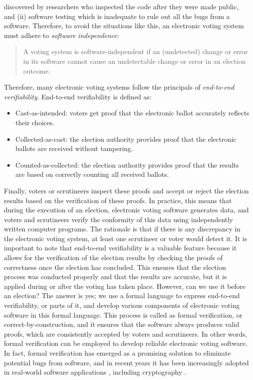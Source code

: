 \documentclass[conference,compsoc]{IEEEtran}
\begin{document}
discovered by researchers who inspected the code after they were made public, and 
(ii) software testing which is inadequate to rule out all the bugs 
from a software. Therefore, to avoid the situations like this, 
an electronic voting system must adhere to \textit{software independence}\cite{rivest2008notion}:
\begin{quote}
  A voting system is software-independent if an
  (undetected) change or error in its software cannot
  cause an undetectable change or error in an
  election outcome. 
\end{quote}
\noindent
Therefore, many electronic voting systems follow the principals 
of \textit{end-to-end verifiability}. End-to-end verifiability is 
defined as: 
\begin{itemize}
  \item Cast-as-intended: voters get proof that the electronic ballot accurately reflects their choices.
  \item Collected-as-cast: the election authority provides proof that the electronic ballots are received without tampering.
  \item Counted-as-collected: the election authority provides proof that the results are based on correctly counting all received ballots.
\end{itemize} 


\noindent 
Finally, voters or scrutineers inspect these proofs and accept or reject the election results based on 
the verification of these proofs. In practice, this means that during the execution of an election, 
electronic voting software generates data, and voters and scrutineers verify the conformity of 
this data using independently written computer programs. The rationale is that if there is 
any discrepancy in the electronic voting system, at least one scrutineer or voter would detect it.
It is important to note that end-to-end verifiability is a valuable feature because it 
allows for the verification of the election results by checking the proofs of correctness 
once the election has concluded. This ensures that the election process was conducted 
properly and that the results are accurate, but it is applied during or after the voting has taken place.
However, can we use it before an election?
The answer is yes; we use a formal language to express end-to-end verifiability, or parts of 
it, and develop various components of electronic voting 
software in this formal language. This process is called as  formal verification, or correct-by-construction,
and it ensures that the software always produces valid proofs, 
which are consistently accepted by voters and scrutineers. In other words, formal verification
can be employed to develop reliable electronic voting software.
In fact, formal verification has emerged as a promising solution 
to eliminate potential bugs from software, and in recent years it has been increasingly 
adopted in real-world software applications \cite{10.1145/1111037.1111042}, 
including cryptography \cite{8835346,10.1145/3133956.3134043,190894,10.1145/2701415,
10.1145/2660267.2660370,10.1145/3319535.3363211}.
\end{document}
